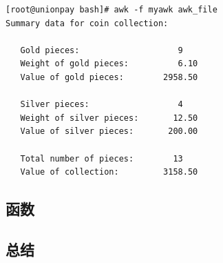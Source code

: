 \begin{verbatim}
[root@unionpay bash]# awk -f myawk awk_file 
Summary data for coin collection:

   Gold pieces:                    9
   Weight of gold pieces:          6.10
   Value of gold pieces:        2958.50

   Silver pieces:                  4
   Weight of silver pieces:       12.50
   Value of silver pieces:       200.00

   Total number of pieces:        13
   Value of collection:         3158.50
\end{verbatim}

\subsection{函数}

\subsection{总结}
